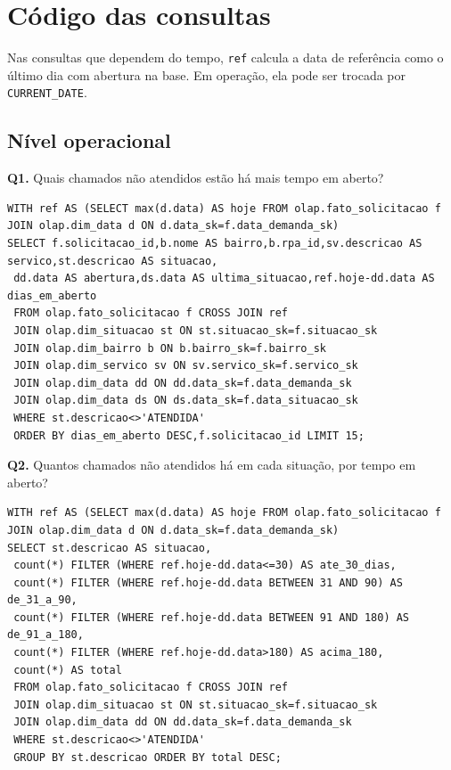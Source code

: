 \documentclass[12pt,a4paper]{article}
\begin{document}
\clearpage
\section{Código das consultas}

Nas consultas que dependem do tempo, \texttt{ref} calcula a data de referência como o último dia com abertura na base. Em operação, ela pode ser trocada por \texttt{CURRENT\_DATE}.

\subsection*{Nível operacional}
\noindent\begin{minipage}{\textwidth}
\small\textbf{Q1.} Quais chamados não atendidos estão há mais tempo em aberto?\par\vspace{2pt}
\begin{lstlisting}
WITH ref AS (SELECT max(d.data) AS hoje FROM olap.fato_solicitacao f JOIN olap.dim_data d ON d.data_sk=f.data_demanda_sk)
SELECT f.solicitacao_id,b.nome AS bairro,b.rpa_id,sv.descricao AS servico,st.descricao AS situacao,
 dd.data AS abertura,ds.data AS ultima_situacao,ref.hoje-dd.data AS dias_em_aberto
 FROM olap.fato_solicitacao f CROSS JOIN ref
 JOIN olap.dim_situacao st ON st.situacao_sk=f.situacao_sk
 JOIN olap.dim_bairro b ON b.bairro_sk=f.bairro_sk
 JOIN olap.dim_servico sv ON sv.servico_sk=f.servico_sk
 JOIN olap.dim_data dd ON dd.data_sk=f.data_demanda_sk
 JOIN olap.dim_data ds ON ds.data_sk=f.data_situacao_sk
 WHERE st.descricao<>'ATENDIDA'
 ORDER BY dias_em_aberto DESC,f.solicitacao_id LIMIT 15;
\end{lstlisting}
\end{minipage}\par\vspace{8pt}
\noindent\begin{minipage}{\textwidth}
\small\textbf{Q2.} Quantos chamados não atendidos há em cada situação, por tempo em aberto?\par\vspace{2pt}
\begin{lstlisting}
WITH ref AS (SELECT max(d.data) AS hoje FROM olap.fato_solicitacao f JOIN olap.dim_data d ON d.data_sk=f.data_demanda_sk)
SELECT st.descricao AS situacao,
 count(*) FILTER (WHERE ref.hoje-dd.data<=30) AS ate_30_dias,
 count(*) FILTER (WHERE ref.hoje-dd.data BETWEEN 31 AND 90) AS de_31_a_90,
 count(*) FILTER (WHERE ref.hoje-dd.data BETWEEN 91 AND 180) AS de_91_a_180,
 count(*) FILTER (WHERE ref.hoje-dd.data>180) AS acima_180,
 count(*) AS total
 FROM olap.fato_solicitacao f CROSS JOIN ref
 JOIN olap.dim_situacao st ON st.situacao_sk=f.situacao_sk
 JOIN olap.dim_data dd ON dd.data_sk=f.data_demanda_sk
 WHERE st.descricao<>'ATENDIDA'
 GROUP BY st.descricao ORDER BY total DESC;
\end{lstlisting}
\end{minipage}\par\vspace{8pt}
\end{document}
